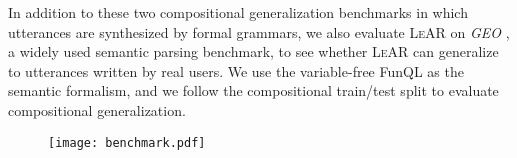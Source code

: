 \documentclass[11pt,a4paper]{article}
\begin{document}
In addition to these two compositional generalization benchmarks in which utterances are synthesized by formal grammars, we also evaluate \textsc{LeAR} on \textit{GEO} \cite{zelle1996learning-csp}, a widely used semantic parsing benchmark, to see whether \textsc{LeAR} can generalize to utterances written by real users.
We use the variable-free FunQL \cite{kate2005geofunql} as the semantic formalism, and we follow the compositional train/test split \cite{finegan2018geosplit} to evaluate compositional generalization.



\begin{figure}
\begin{minipage}[tp]{\linewidth}
\begin{minipage}[b]{\linewidth}
\centering
  \texttt{[image: benchmark.pdf]}
  \label{fig:example}
\end{minipage}

\vspace{0.3cm}

\begin{minipage}[b]{\linewidth}
\centering
{}
\label{tab:dataset}
\end{minipage}
 \end{minipage}
 \end{figure}
 
\end{document}
